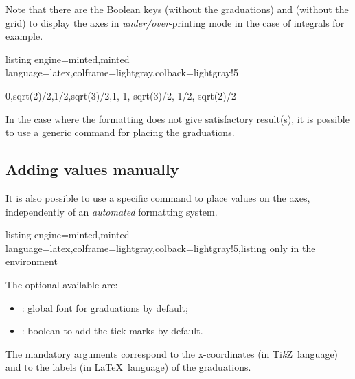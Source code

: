 \documentclass[11pt,a4paper]{ltxdoc}
\providecommand\tikzlogo{Ti\textit{k}Z}
\let\TikZ\tikzlogo
\begin{document}
Note that there are the Boolean keys \MontreCode{[Behind]} (without the graduations) and \MontreCode{[Above]} (without the grid) to display the axes in \textit{under/over}-printing mode in the case of integrals for example.

\begin{tcblisting}{listing engine=minted,minted language=latex,colframe=lightgray,colback=lightgray!5}
\begin{GraphTikz}%
	[x=2.75cm,y=3cm,
	Xmin=0,Xmax=3.5,Xgrid=pi/12,Xgrids=pi/24,
	Ymin=-1.05,Ymax=1.05,Ygrid=0.2,Ygrids=0.05]
	{0,sqrt(2)/2,1/2,sqrt(3)/2,1,-1,-sqrt(3)/2,-1/2,-sqrt(2)/2}
\end{GraphTikz}
\end{tcblisting}

In the case where the formatting does not give satisfactory result(s), it is possible to use a generic command for placing the graduations.

\subsection{Adding values manually}\label{additionvals}

It is also possible to use a specific command to place values on the axes, independently of an \textit{automated} formatting system.

\begin{tcblisting}{listing engine=minted,minted language=latex,colframe=lightgray,colback=lightgray!5,listing only}
in the environment
\end{tcblisting}

The optional \MontreCode{[keys]} available are:

\smallskip

\begin{itemize}
	\item {}: global font for graduations { by default};
	\item {}: boolean to add the tick marks { by default}.
\end{itemize}

\smallskip

The mandatory arguments correspond to the x-coordinates (in \TikZ\ language) and to the labels (in \LaTeX\ language) of the graduations.
\end{document}
